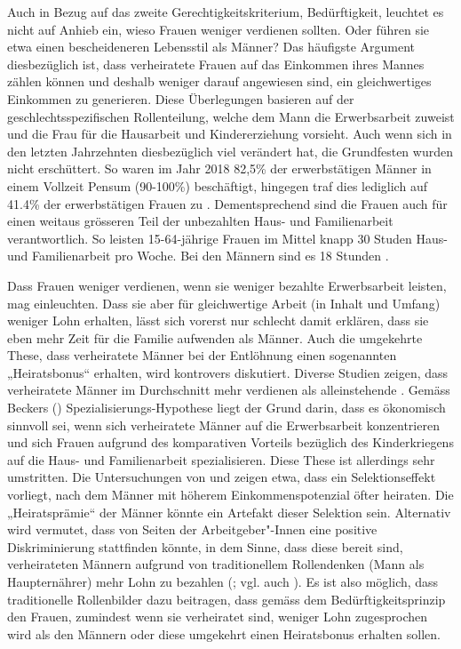 \documentclass[a4paper,12pt]{article}
\renewcommand{\baselinestretch}{1.1}
\newif\ifcomments
\newcommand{\comment}[1]{%
    \ifcomments\marginpar{\renewcommand{\baselinestretch}{1}\tiny\hspace*{-1.1em}\colorbox{gray!20}%
    {\textcolor{red}{\parbox[t]{.9in}{\raggedright #1}}}}\fi}
\begin{document}
Auch in Bezug auf das zweite Gerechtigkeitskriterium, Bedürftigkeit, leuchtet
es nicht auf Anhieb ein, wieso Frauen weniger verdienen sollten. Oder führen
sie etwa einen bescheideneren Lebensstil als Männer? Das häufigste Argument
diesbezüglich ist, dass verheiratete Frauen auf das Einkommen ihres Mannes
zählen können und deshalb weniger darauf angewiesen sind, ein gleichwertiges
Einkommen zu generieren. Diese Überlegungen basieren auf der
geschlechtsspezifischen Rollenteilung, welche dem Mann die Erwerbsarbeit
zuweist und die Frau für die Hausarbeit und Kindererziehung vorsieht. Auch wenn
sich in den letzten Jahrzehnten diesbezüglich viel verändert hat, die
Grundfesten wurden nicht erschüttert. So waren im Jahr 2018 82,5\% der erwerbstätigen Männer in einem Vollzeit Pensum (90-100\%) beschäftigt, hingegen traf dies lediglich auf 41.4\% der erwerbstätigen Frauen zu \citep{BFS-2019d}.
Dementsprechend sind die Frauen auch für einen weitaus grösseren Teil der unbezahlten Haus- und Familienarbeit verantwortlich. So leisten 15-64-jährige Frauen im Mittel knapp 30 Studen Haus- und Familienarbeit pro Woche. Bei den Männern sind es 18 Stunden \citep{BFS-2017}. \comment{Hier evtl. etwas ergänzen.-> Habe ein paar Zahlen und Erläuterungen ergänzt. Macht das überhaupt Sinn hier?}
Dass Frauen weniger verdienen, wenn sie weniger bezahlte Erwerbsarbeit leisten, mag einleuchten. Dass sie aber für gleichwertige Arbeit (in Inhalt und Umfang) weniger Lohn erhalten, lässt sich vorerst nur schlecht damit erklären, dass sie eben mehr Zeit für die Familie aufwenden als Männer. Auch die umgekehrte These, dass verheiratete Männer bei der Entlöhnung einen sogenannten „Heiratsbonus“ erhalten, wird kontrovers diskutiert. \comment{die folgenden beiden Abschnitte sind aus dem Kapitel von Exp. 3 ausgeschnitten und verschoben worden.} Diverse Studien zeigen, dass verheiratete Männer im Durchschnitt mehr verdienen als alleinstehende
\citep{Budig-Lim-2016,Killewald-Gough-2013}. Gemäss Beckers
(\citeyear{Becker-1981}) Spezialisierungs-Hypothese liegt der Grund darin, dass
es ökonomisch sinnvoll sei, wenn sich verheiratete Männer auf die Erwerbsarbeit
konzentrieren und sich Frauen aufgrund des komparativen Vorteils bezüglich des
Kinderkriegens auf die Haus- und Familienarbeit spezialisieren. Diese These ist
allerdings sehr umstritten. Die Untersuchungen von \citet{Ludwig-Bruederl-2011}
und \citet{Jakobsson-Kotsadam-2016} zeigen etwa, dass ein Selektionseffekt
vorliegt, nach dem Männer mit höherem Einkommenspotenzial öfter heiraten. Die
„Heiratsprämie“ der Männer könnte ein Artefakt dieser Selektion sein.
Alternativ wird vermutet, dass von Seiten der Arbeitgeber"-Innen eine positive
Diskriminierung stattfinden könnte, in dem Sinne, dass diese bereit sind,
verheirateten Männern aufgrund von traditionellem Rollendenken (Mann
als Haupternährer) mehr Lohn zu bezahlen (\citealp{Budig-Lim-2016}; vgl. auch
\citealp{Killewald-Gough-2013}). 
Es ist also möglich, dass traditionelle Rollenbilder dazu beitragen, dass gemäss dem Bedürftigkeitsprinzip den Frauen, zumindest wenn sie verheiratet sind, weniger Lohn zugesprochen wird als den Männern oder diese umgekehrt einen Heiratsbonus erhalten sollen.
\end{document}
